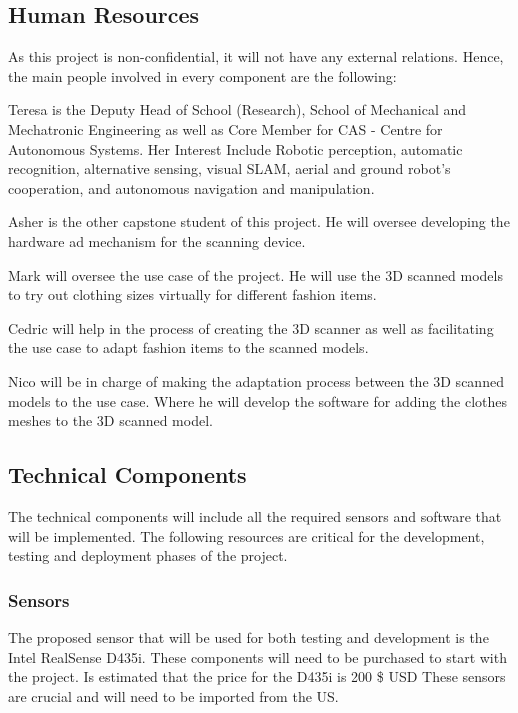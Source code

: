 \documentclass[12pt]{report}
\begin{document}
\subsection{Human Resources}
As this project is non-confidential, it will not have any external relations. Hence, the main people involved in every component are the following:
\begin{description}[style=nextline]
  \item[Academic Supervisor – Dr Teresa Vidal Calleja] Teresa is the Deputy Head of School (Research), School of Mechanical and Mechatronic Engineering as well as Core Member for CAS - Centre for Autonomous Systems. Her Interest Include Robotic perception, automatic recognition, alternative sensing, visual SLAM, aerial and ground robot’s cooperation, and autonomous navigation and manipulation.
  \item[Hardware Component lead – Asher Katz] Asher is the other capstone student of this project. He will oversee developing the hardware ad mechanism for the scanning device.
  \item[Use cases Component Lead – Mark Liu] Mark will oversee the use case of the project. He will use the 3D scanned models to try out clothing sizes virtually for different fashion items.
  \item[Cedric Le Gentil] Cedric will help in the process of creating the 3D scanner as well as facilitating the use case to adapt fashion items to the scanned models.
  \item[Nico Pietroni] Nico will be in charge of making the adaptation process between the 3D scanned models to the use case. Where he will develop the software for adding the clothes meshes to the 3D scanned model.
\end{description}

\subsection{Technical Components }
The technical components will include all the required sensors and software that will be implemented. The following resources are critical for the development, testing and deployment phases of the project. 

\subsubsection{Sensors}
The proposed sensor that will be used for both testing and development is the Intel RealSense D435i. These components will need to be purchased to start with the project. Is estimated that the price for the D435i is 200 \$ USD
These sensors are crucial and will need to be imported from the US. 
\end{document}
